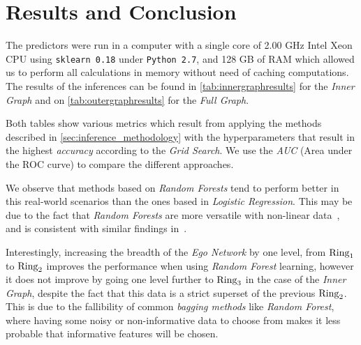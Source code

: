 \section{Results and Conclusion}
\label{sec:results}


The predictors were run in a computer with a single core of 2.00 GHz Intel Xeon CPU using \texttt{sklearn 0.18} under \texttt{Python 2.7}, and 128 GB of RAM which allowed us to perform all calculations in memory without need of caching computations. The results of the inferences can be found in \cref{tab:innergraphresults} for the \emph{Inner Graph} and on \cref{tab:outergraphresults} for the \emph{Full Graph}.


Both tables show various metrics which result from applying the methods described in \cref{sec:inference_methodology} with the hyperparameters that result in the highest \emph{accuracy} according to the \emph{Grid Search}.
We use the \emph{AUC} (Area under the ROC curve) to compare the different approaches.

We observe that methods based on \emph{Random Forests} tend to perform better in this real-world scenarios than the ones based in \emph{Logistic Regression}.
This may be due to the fact that \emph{Random Forests} are more versatile with non-linear data~\cite{logisticvsdecision}, and is consistent with similar findings in~\cite{muchlinski2016}.

Interestingly, increasing the breadth of the \emph{Ego Network} by one level, from $\operatorname{Ring}_1$ to $\operatorname{Ring}_2$ improves the performance when using \emph{Random Forest} learning, however it does not improve by going one level further to $\operatorname{Ring}_3$ in the case of the \emph{Inner Graph}, despite the fact that this data is a strict superset of the previous $\operatorname{Ring}_2$. This is due to the fallibility of common \emph{bagging methods} like \emph{Random Forest}, where having some noisy or non-informative data to choose from makes it less probable that informative features will be chosen.

